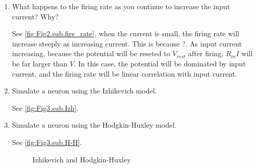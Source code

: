 \documentclass[11pt]{article}
\begin{document}
\begin{enumerate}
		\item What happens to the firing rate as you continue to increase the input current? Why?
		
		See \ref{fig:Fig2.sub.fire_rate}, when the current is small, the firing rate will increase steeply as increasing current. This is because ?. As input current increasing, because the potential will be reseted to $V_{rest}$ after firing, $R_mI$ will be far larger than $V$. In this case, the potential will be dominated by input current, and the firing rate will be linear correlation with input current.
		
		\item Simulate a neuron using the Izhikevich model.
		
		See \ref{fig:Fig3.sub.Izh}.
		\item Simulate a neuron using the Hodgkin-Huxley model.
		
		See \ref{fig:Fig3.sub.H-H}.
		\begin{figure}[ht]
			\centering
			\caption{Izhikevich and Hodgkin-Huxley}
		\end{figure}
		

\end{enumerate}
\end{document}

